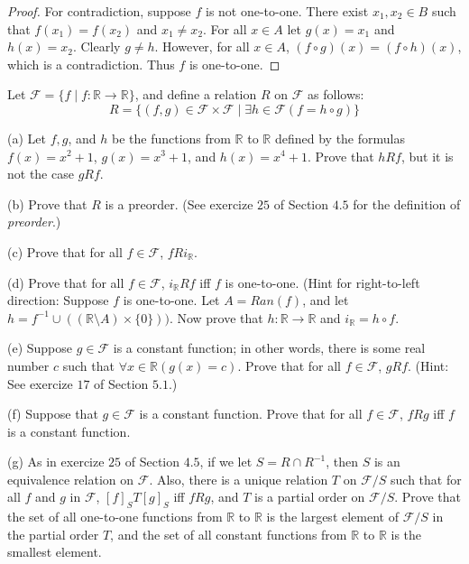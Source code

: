 \begin{proof}
    For contradiction, suppose $f$ is not one-to-one.
    There exist $x_1, x_2 \in B$ such that $f(x_1) = f(x_2)$
        and $x_1 \ne x_2$.
    For all $x \in A$ let $g(x) = x_1$ and $h(x) = x_2$.
    Clearly $g \ne h$.
    However, for all $x \in A$, $(f \circ g)(x) = (f \circ h)(x)$,
        which is a contradiction.
    Thus $f$ is one-to-one.
\end{proof}

\begin{tcolorbox}[title=Problem 22, breakable]
    Let $\mathcal{F} = \{f \mid f : \mathbb{R} \rightarrow \mathbb{R}\}$,
        and define a relation $R$ on $\mathcal{F}$ as follows:
    \[R = \{(f, g) \in \mathcal{F} \times \mathcal{F} \mid \exists{h} \in \mathcal{F}(f = h \circ g)\}\]

    (a) Let $f, g$, and $h$ be the functions from $\mathbb{R}$ to $\mathbb{R}$ defined by the 
        formulas $f(x) = x^2 + 1$, $g(x) = x^3 + 1$, and $h(x) = x^4 + 1$. Prove that $hRf$,
        but it is not the case $gRf$.

    (b) Prove that $R$ is a preorder. (See exercize $25$ of Section $4.5$ for the
        definition of \emph{preorder}.)

    (c) Prove that for all $f \in \mathcal{F}$, $f R i_{\mathbb{R}}$.

    (d) Prove that for all $f \in \mathcal{F}$, $i_{\mathbb{R}} R f$ iff $f$ is one-to-one.
        (Hint for right-to-left direction: Suppose $f$ is one-to-one. Let $A = Ran(f)$, and 
         let $h = f^{-1} \cup ((\mathbb{R} \setminus A) \times \{0\}))$. Now prove that 
         $h : \mathbb{R} \rightarrow \mathbb{R}$ and $i_{\mathbb{R}} = h \circ f$.

    (e) Suppose $g \in \mathcal{F}$ is a constant function; in other words, there is some 
        real number $c$ such that $\forall{x} \in \mathbb{R}(g(x) = c)$. Prove that for all 
        $f \in \mathcal{F}$, $g R f$. (Hint: See exercize $17$ of Section $5.1$.)

    (f) Suppose that $g \in \mathcal{F}$ is a constant function.
        Prove that for all $f \in \mathcal{F}$, $f R g$ iff $f$ is a constant function.

    (g) As in exercize $25$ of Section $4.5$, if we let $S = R \cap R^{-1}$, then $S$ 
        is an equivalence relation on $\mathcal{F}$. Also, there is a unique relation 
        $T$ on $\mathcal{F} / S$ such that for all $f$ and $g$ in $\mathcal{F}$,
        $[f]_S T [g]_S$ iff $f R g$, and $T$ is a partial order on $\mathcal{F} / S$.
        Prove that the set of all one-to-one functions from $\mathbb{R}$ to $\mathbb{R}$
        is the largest element of $\mathcal{F} / S$ in the partial order $T$, and the set 
        of all constant functions from $\mathbb{R}$ to $\mathbb{R}$ is the smallest element.
\end{tcolorbox}

